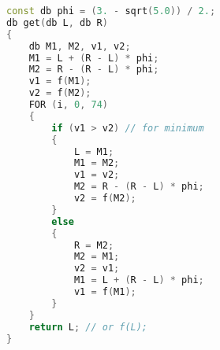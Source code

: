 \begin{lstlisting}[caption={ternary.hpp}, language=C++]
const db phi = (3. - sqrt(5.0)) / 2.;
db get(db L, db R)
{
	db M1, M2, v1, v2;
	M1 = L + (R - L) * phi;
	M2 = R - (R - L) * phi;
	v1 = f(M1);
	v2 = f(M2);
	FOR (i, 0, 74)
	{
 	   	if (v1 > v2) // for minimum
		{
			L = M1;
			M1 = M2;
			v1 = v2;
			M2 = R - (R - L) * phi;
			v2 = f(M2);
		}
		else
		{
			R = M2;
			M2 = M1;
			v2 = v1;
			M1 = L + (R - L) * phi;
			v1 = f(M1);
		}
	}
	return L; // or f(L);
}
\end{lstlisting}
